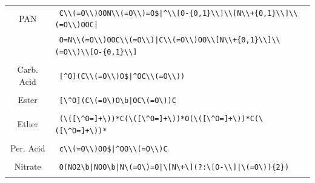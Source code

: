 %



\begin{table}[H]
    \centering
    \begin{tabular}{c|p{5in}}


PAN & \verb! C\\(=O\\)OON\\(=O\\)=O$|^\\[O-{0,1}\\]\\[N\\+{0,1}\\]\\(=O\\)OOC|!\\&\verb! O=N\\(=O\\)OOC\\(=O\\)|C\\(=O\\)OO\\[N\\+{0,1}\\]\\(=O\\)\\[O-{0,1}\\]!\\&\\

Carb. Acid & \verb! [^O](C\\(=O\\)O$|^OC\\(=O\\))!\\&\\

Ester & \verb! [\^O](C\(=O\)O\b|OC\(=O\))C!\\&\\

Ether & \verb! (\([\^O=]+\))*C(\([\^O=]+\))*O(\([\^O=]+\))*C(\([\^O=]+\))*!\\&\\

Per. Acid & \verb! c\\(=O\\)OO$|^OO\\(=O\\)C!\\&\\

Nitrate & \verb! O(NO2\b|NOO\b|N\(=O\)=O|\[N\+\](?:\[O-\\]|\(=O\)){2})!\\&\\


\end{tabular}
\end{table}

